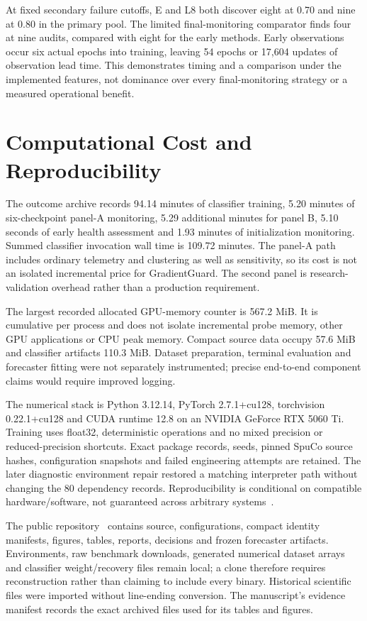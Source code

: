 \documentclass[nolineno]{ieeeaccess}
\begin{document}
At fixed secondary failure cutoffs, E and L8 both discover eight at 0.70 and nine at 0.80 in the primary pool. The limited final-monitoring comparator finds four at nine audits, compared with eight for the early methods. Early observations occur six actual epochs into training, leaving 54 epochs or 17,604 updates of observation lead time. This demonstrates timing and a comparison under the implemented features, not dominance over every final-monitoring strategy or a measured operational benefit.

\section{Computational Cost and Reproducibility}
\label{sec:cost}
The outcome archive records 94.14 minutes of classifier training, 5.20 minutes of six-checkpoint panel-A monitoring, 5.29 additional minutes for panel B, 5.10 seconds of early health assessment and 1.93 minutes of initialization monitoring. Summed classifier invocation wall time is 109.72 minutes. The panel-A path includes ordinary telemetry and clustering as well as sensitivity, so its cost is not an isolated incremental price for GradientGuard. The second panel is research-validation overhead rather than a production requirement.

The largest recorded allocated GPU-memory counter is 567.2 MiB. It is cumulative per process and does not isolate incremental probe memory, other GPU applications or CPU peak memory. Compact source data occupy 57.6 MiB and classifier artifacts 110.3 MiB. Dataset preparation, terminal evaluation and forecaster fitting were not separately instrumented; precise end-to-end component claims would require improved logging.

The numerical stack is Python 3.12.14, PyTorch 2.7.1+cu128, torchvision 0.22.1+cu128 and CUDA runtime 12.8 on an NVIDIA GeForce RTX 5060 Ti. Training uses float32, deterministic operations and no mixed precision or reduced-precision shortcuts. Exact package records, seeds, pinned SpuCo source hashes, configuration snapshots and failed engineering attempts are retained. The later diagnostic environment repair restored a matching interpreter path without changing the 80 dependency records. Reproducibility is conditional on compatible hardware/software, not guaranteed across arbitrary systems~\cite{pytorch}.

The public repository~\cite{repository} contains source, configurations, compact identity manifests, figures, tables, reports, decisions and frozen forecaster artifacts. Environments, raw benchmark downloads, generated numerical dataset arrays and classifier weight/recovery files remain local; a clone therefore requires reconstruction rather than claiming to include every binary. Historical scientific files were imported without line-ending conversion. The manuscript's evidence manifest records the exact archived files used for its tables and figures.
\end{document}
